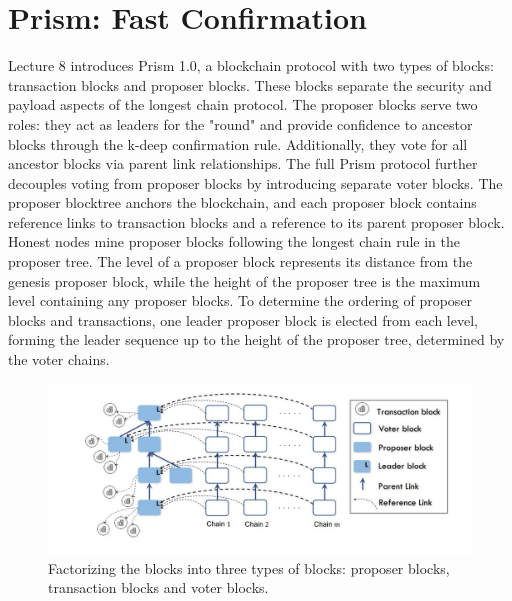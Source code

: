 \section{Prism: Fast Confirmation}
Lecture 8 introduces Prism 1.0, a blockchain protocol with two types of blocks: transaction blocks and proposer blocks. These blocks separate the security and payload aspects of the longest chain protocol. The proposer blocks serve two roles: they act as leaders for the "round" and provide confidence to ancestor blocks through the k-deep confirmation rule. Additionally, they vote for all ancestor blocks via parent link relationships. The full Prism protocol further decouples voting from proposer blocks by introducing separate voter blocks. The proposer blocktree anchors the blockchain, and each proposer block contains reference links to transaction blocks and a reference to its parent proposer block. Honest nodes mine proposer blocks following the longest chain rule in the proposer tree. The level of a proposer block represents its distance from the genesis proposer block, while the height of the proposer tree is the maximum level containing any proposer blocks. To determine the ordering of proposer blocks and transactions, one leader proposer block is elected from each level, forming the leader sequence up to the height of the proposer tree, determined by the voter chains.
\begin{center}
	\begin{figure}
		\centering
		\includegraphics[width=0.8\linewidth]{Fig/09/F3}
		\caption{Factorizing the blocks into three types of blocks: proposer blocks, transaction blocks and voter blocks.}
		\label{fig:L9_f3}
	\end{figure}
\end{center}
